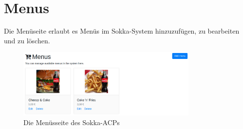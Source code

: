 \section{Menus}

Die Menüseite erlaubt es Menüs im Sokka-System hinzuzufügen, zu bearbeiten und zu löschen.

\begin{figure}[ht]
    \centering
    \includegraphics[width=0.8\textwidth]{images/ACP/menus.png}
    \caption{Die Menüsseite des Sokka-ACPs}
\end{figure}
